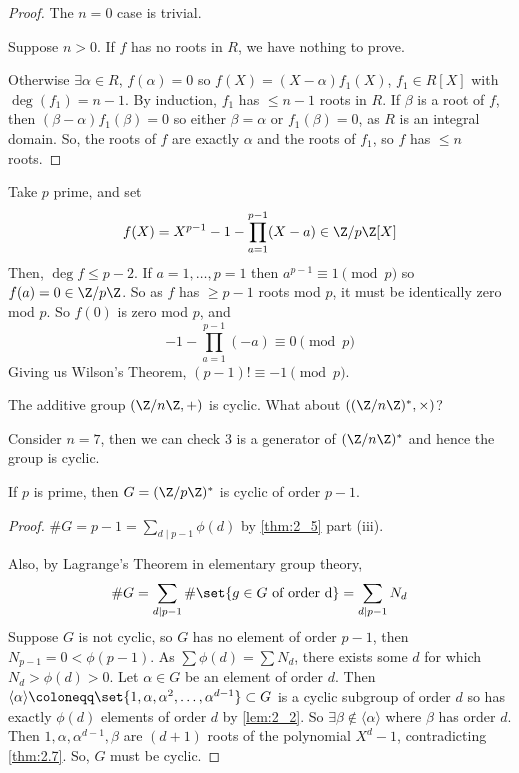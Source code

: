 \documentclass{article}
\begin{document}
\begin{proof}
    The $n=0$ case is trivial.

    Suppose $n > 0$. If $f$ has no roots in $R$, we have nothing to prove.

    Otherwise $\exists \alpha \in R$, $f(\alpha) = 0$ so $f(X) = (X - \alpha) f_1(X)$, $f_1 \in R[X]$ with $\deg(f_1) = n-1$.
    By induction, $f_1$ has $\leq n-1$ roots in $R$.
    If $\beta$ is a root of $f$, then $(\beta-\alpha) f_1(\beta) = 0$ so either $\beta = \alpha$ or $f_1(\beta) = 0$, as $R$ is an integral domain.
    So, the roots of $f$ are exactly $\alpha$ and the roots of $f_1$, so $f$ has $\leq n$ roots.
\end{proof}

\begin{eg}
    Take $p$ prime, and set
    \begin{equation*}f(X) = X^{p-1} - 1 - \prod_{a=1}^{p-1} (X - a) \in \Z / p \Z [X]\end{equation*}
    Then, $\deg f \leq p-2$. If $a=1, \dotsc, p=1$ then $a^{p-1} \equiv 1 \pmod{p}$ so $f(a) = 0 \in \Z/p\Z$.
    So as $f$ has $\geq p-1$ roots mod $p$, it must be identically zero mod $p$. So $f(0)$ is zero mod $p$, and
    \begin{equation*}
        -1 - \prod_{a=1}^{p-1} (-a) \equiv 0 \pmod{p}
    \end{equation*}
    Giving us Wilson's Theorem, $(p-1)! \equiv -1 \pmod{p}$.
\end{eg}

The additive group $(\Z / n\Z, +)$ is cyclic. What about $((\Z/n\Z)^*, \times)$?

\begin{eg}
    Consider $n=7$, then we can check $3$ is a generator of $(\Z / n \Z)^*$ and hence the group is cyclic.
\end{eg}

\begin{nthm}
    If $p$ is prime, then $G = (\Z / p \Z)^*$ is cyclic of order $p-1$.
\end{nthm}

\begin{proof}
    $\# G = p-1 = \sum_{d \mid p-1} \phi(d)$ by \cref{thm:2_5} part (iii).

    Also, by Lagrange's Theorem in elementary group theory, \begin{equation*}\# G = \sum_{d \mid p-1} \# \set{g \in G \ \text{of order d}} = \sum_{d \mid p-1} N_d\end{equation*}
    Suppose $G$ is not cyclic, so $G$ has no element of order $p-1$, then ${N_{p-1} = 0 < \phi(p-1)}$.
    As $\sum \phi(d) = \sum N_d$, there exists some $d$ for which $N_d > \phi(d) > 0$. Let $\alpha \in G$ be an element of order $d$.
    Then $\langle\alpha\rangle \coloneqq \set{1, \alpha, \alpha^2, \dotsc, \alpha^{d-1}} \subset G$ is a cyclic subgroup of order $d$ so has exactly $\phi(d)$ elements of order $d$ by \cref{lem:2_2}.
    So $\exists \beta \notin \langle\alpha\rangle$ where $\beta$ has order $d$.
    Then $1, \alpha, \alpha^{d-1}, \beta$ are $(d+1)$ roots of the polynomial $X^d - 1$, contradicting \cref{thm:2.7}.
    So, $G$ must be cyclic.
\end{proof}
\end{document}
